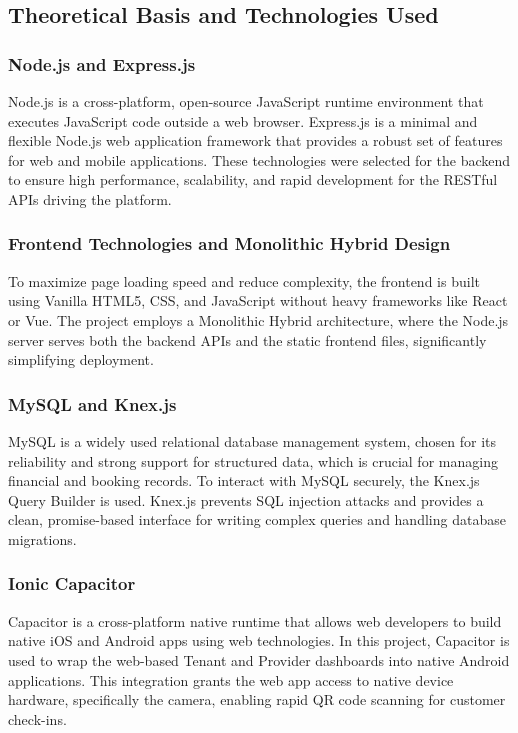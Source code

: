 \subsection{Theoretical Basis and Technologies Used}

\subsubsection{Node.js and Express.js}
Node.js is a cross-platform, open-source JavaScript runtime environment that executes JavaScript code outside a web browser. Express.js is a minimal and flexible Node.js web application framework that provides a robust set of features for web and mobile applications. These technologies were selected for the backend to ensure high performance, scalability, and rapid development for the RESTful APIs driving the platform.

\subsubsection{Frontend Technologies and Monolithic Hybrid Design}
To maximize page loading speed and reduce complexity, the frontend is built using Vanilla HTML5, CSS, and JavaScript without heavy frameworks like React or Vue. The project employs a Monolithic Hybrid architecture, where the Node.js server serves both the backend APIs and the static frontend files, significantly simplifying deployment.

\subsubsection{MySQL and Knex.js}
MySQL is a widely used relational database management system, chosen for its reliability and strong support for structured data, which is crucial for managing financial and booking records. To interact with MySQL securely, the Knex.js Query Builder is used. Knex.js prevents SQL injection attacks and provides a clean, promise-based interface for writing complex queries and handling database migrations.

\subsubsection{Ionic Capacitor}
Capacitor is a cross-platform native runtime that allows web developers to build native iOS and Android apps using web technologies. In this project, Capacitor is used to wrap the web-based Tenant and Provider dashboards into native Android applications. This integration grants the web app access to native device hardware, specifically the camera, enabling rapid QR code scanning for customer check-ins.


